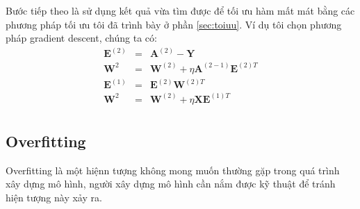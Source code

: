\begin{enumerate}
Bước tiếp theo là sử dụng kết quả vừa tìm được để tối ưu hàm mất mát bằng các phương pháp tối ưu tôi đã trình bày ở phần \ref{sec:toiuu}. Ví dụ tôi chọn phương pháp gradient descent, chúng ta có:
\begin{eqnarray}
\textbf{E}^{(2)} &=& \textbf{A}^{(2)}-\textbf{Y}\\
\textbf{W}^{2} &=& \textbf{W}^{(2)} + \eta \textbf{A}^{(2-1)}\textbf{E}^{(2)T}\\
 \textbf{E}^{(1)} &=& \textbf{E}^{(2)}\textbf{W}^{(2)T}\\
\textbf{W}^{2} &=& \textbf{W}^{(2)} + \eta \textbf{X}\textbf{E}^{(1)T}\\
\end{eqnarray}


\end{enumerate}
\subsection{Overfitting}
\hspace{5mm} Overfitting là một hiệnn tượng không mong muốn thường gặp trong quá trình xây dựng mô hình, người xây dựng mô hình cần nắm được kỹ thuật để tránh hiện tượng này xảy ra.
